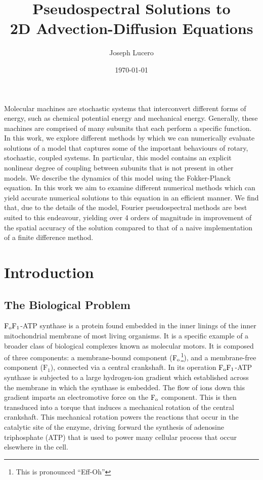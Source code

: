 \documentclass[10pt]{article}
\title{Pseudospectral Solutions to \\ 2D Advection-Diffusion Equations}
\author{Joseph Lucero}
\date{\today}
\newcommand{\fo}{\mathrm{F}_{\rm o}}
\newcommand{\fI}{\mathrm{F}_{1}}
\newcommand{\fofI}{\mathrm{F}_{\rm o}\mathrm{F}_{1}}
\begin{document}
\maketitle

Molecular machines are stochastic systems that interconvert different forms of energy, such as chemical potential 
energy and mechanical energy. Generally, these machines are comprised of many subunits that each perform a specific
function. In this work, we explore different methods by which we can numerically evaluate solutions of a model that 
captures some of the important behaviours of rotary, stochastic, coupled systems. In particular, this model contains an 
explicit nonlinear degree of coupling between subunits that is not present in other models. We describe the dynamics of 
this model using the Fokker-Planck equation. In this work we aim to examine different numerical methods which can yield
accurate numerical solutions to this equation in an efficient manner. We find that, due to the details of the model, 
Fourier pseudospectral methods are best suited to this endeavour, yielding over 4 orders of magnitude in improvement 
of the spatial accuracy of the solution compared to that of a naive implementation of a finite difference method. 

\section{Introduction}

\subsection{The Biological Problem}

$\fofI$-ATP synthase is a protein found embedded in the inner linings of the inner mitochondrial membrane of 
most living organisms. It is a specific example of a broader class of biological complexes known as molecular motors.
It is composed of three components: a membrane-bound component ($\fo$\footnote{This is pronounced ``Eff-Oh''}), 
and a membrane-free component ($\fI$), connected via a 
central crankshaft. In its operation $\fofI$-ATP synthase is subjected to a large hydrogen-ion gradient 
which established across the membrane in which the synthase is embedded. The flow of ions down this 
gradient imparts an electromotive force on the $\fo$ component. This is then transduced into a torque that 
induces a mechanical rotation of the central crankshaft. This mechanical rotation powers the reactions that 
occur in the catalytic site of the enzyme, driving forward the synthesis of adenosine triphosphate (ATP) that is used
to power many cellular process that occur elsewhere in the cell.
\end{document}
